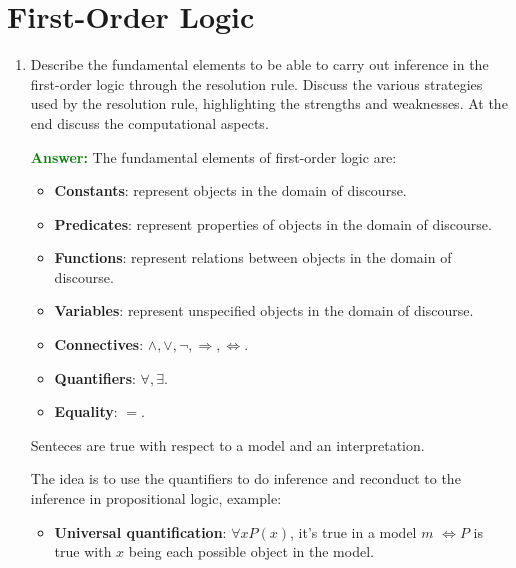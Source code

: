 \documentclass[12pt]{article}
\begin{document}
\section{First-Order Logic}
\begin{enumerate}[label=\textbf{FOL.\arabic*}]

    \item Describe the fundamental elements to be able to carry out inference in the first-order logic through the resolution rule.
    Discuss the various strategies used by the resolution rule, highlighting the strengths and weaknesses.
    At the end discuss the computational aspects.

    \textcolor{green}{\textbf{Answer:}}
    The fundamental elements of first-order logic are:
    \begin{itemize}
        \item \textbf{Constants}: represent objects in the domain of discourse.
        \item \textbf{Predicates}: represent properties of objects in the domain of discourse.
        \item \textbf{Functions}: represent relations between objects in the domain of discourse.
        \item \textbf{Variables}: represent unspecified objects in the domain of discourse.
        \item \textbf{Connectives}: $\land,\lor,\lnot,\Rightarrow,\Leftrightarrow$.
        \item \textbf{Quantifiers}: $\forall,\exists$.
        \item \textbf{Equality}: $=$.
    \end{itemize}
    Senteces are true with respect to a model and an interpretation.

    The idea is to use the quantifiers to do inference and reconduct to the inference in propositional logic, example:
    \begin{itemize}
        \item\textbf{Universal quantification}: $\forall x P(x)$, it's true in a model $m$ $\iff P$ is true with $x$ being each 
        possible object in the model.


\end{itemize}
\end{enumerate}
\end{document}

